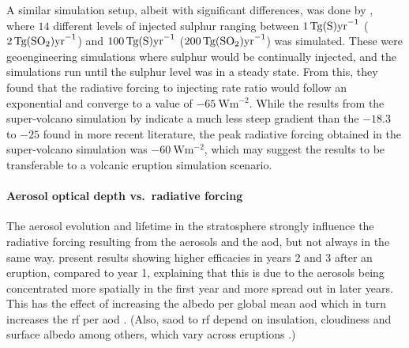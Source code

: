 \documentclass{ametsocV5}
\begin{document}
A similar simulation setup, albeit with significant differences, was done by
\citet{niemeier2015}, where \(14\) different levels of injected sulphur ranging between
\(\SI{1}{\tera\gram(\ce{S})\mathrm{yr}^{-1}}\)
(\(\SI{2}{\tera\gram(\ce{SO2})\mathrm{yr}^{-1}}\)) and
\(\SI{100}{\tera\gram(\ce{S})\mathrm{yr}^{-1}}\)
(\(\SI{200}{\tera\gram(\ce{SO2})\mathrm{yr}^{-1}}\)) was simulated. These were
geoengineering simulations where sulphur would be continually injected, and the
simulations run until the sulphur level was in a steady state. From this, they found
that the radiative forcing to injecting rate ratio would follow an exponential and
converge to a value of \(\SI{-65}{\watt\metre^{-2}}\). While the results from the
super-volcano simulation by \citet{jones2005} indicate a much less steep gradient than
the \(-18.3\) to \(-25\) found in more recent literature, the peak radiative forcing
obtained in the super-volcano simulation was \(\SI{-60}{\watt\metre^{-2}}\), which may
suggest the \citet{niemeier2015} results to be transferable to a volcanic eruption
simulation scenario.

\paragraph*{Aerosol optical depth vs.\ radiative forcing}

The aerosol evolution and lifetime in the stratosphere strongly influence the radiative
forcing resulting from the aerosols and the \acrshort{aod}, but not always in the same
way. \citet{marshall2020} present results showing higher efficacies in years 2 and 3
after an eruption, compared to year 1, explaining that this is due to the aerosols being
concentrated more spatially in the first year and more spread out in later years. This
has the effect of increasing the albedo per global mean \acrshort{aod} which in turn
increases the \acrshort{rf} per \acrshort{aod} \citep{marshall2020}. (Also,
\acrshort{saod} to \acrshort{rf} depend on insulation, cloudiness and surface albedo
among others, which vary across eruptions \citep{marshall2021,andersson2015}.)

\end{document}
